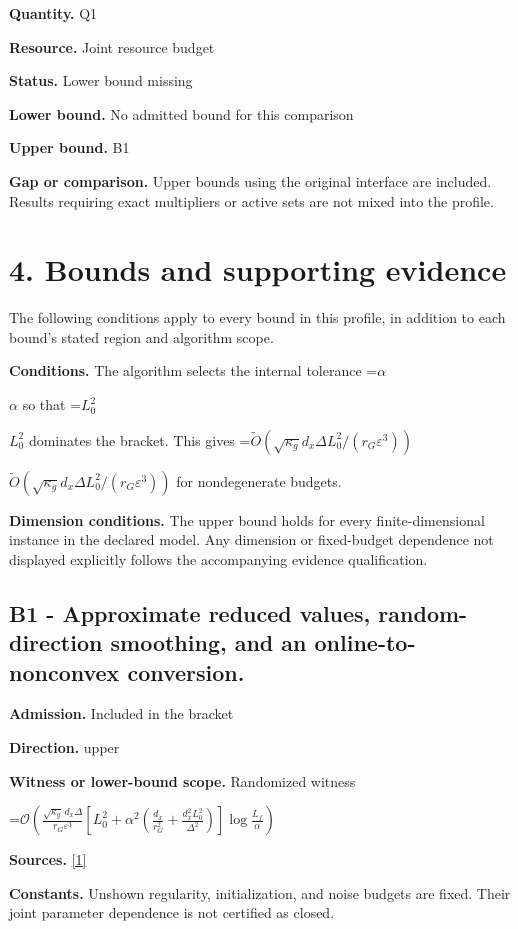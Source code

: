 \documentclass[10pt,a4paper]{article}
\newcommand{\AtlasMath}[1]{\par\begingroup\centering\setbox0=\hbox{$\displaystyle #1$}\ifdim\wd0>1.4\linewidth\typeout{ATLAS WIDE FORMULA: \the\wd0}\fi\ifdim\wd0>\linewidth\resizebox{\linewidth}{!}{\box0}\else\box0\fi\par\endgroup}
\newcommand{\AtlasInlineMath}[1]{\begingroup\setbox0=\hbox{$#1$}\ifdim\wd0>.4\linewidth\endgroup\AtlasMath{#1}\else\endgroup$#1$\fi}
\begin{document}
\textbf{Quantity.} Q1

\textbf{Resource.} Joint resource budget

\textbf{Status.} Lower bound missing

\textbf{Lower bound.} No admitted bound for this comparison

\textbf{Upper bound.} B1

\textbf{Gap or comparison.} Upper bounds using the original interface are included. Results requiring exact multipliers or active sets are not mixed into the profile.

\section{4. Bounds and supporting evidence}
The following conditions apply to every bound in this profile, in addition to each bound's stated region and algorithm scope.

\textbf{Conditions.} The algorithm selects the internal tolerance \AtlasInlineMath{\alpha} so that \AtlasInlineMath{L_0^2} dominates the bracket. This gives \AtlasInlineMath{\widetilde O(\sqrt{\kappa_g}d_x\Delta L_0^2/(r_G\varepsilon^3))} for nondegenerate budgets.

\textbf{Dimension conditions.} The upper bound holds for every finite-dimensional instance in the declared model. Any dimension or fixed-budget dependence not displayed explicitly follows the accompanying evidence qualification.

\subsection{B1 - Approximate reduced values, random-direction smoothing, and an online-to-nonconvex conversion.}
\textbf{Admission.} Included in the bracket

\textbf{Direction.} upper

\textbf{Witness or lower-bound scope.} Randomized witness

\AtlasMath{\mathcal{O}\!\left(\frac{\sqrt{\kappa_g}\,d_x\Delta}{r_G\varepsilon^3}\left[L_0^2+\alpha^2\left(\frac{d_x}{r_G^2}+\frac{d_x^2L_0^2}{\Delta^2}\right)\right]\log\frac{L_f}{\alpha}\right)}
\textbf{Sources.} \href{https://proceedings.neurips.cc/paper_files/paper/2024/file/ffd86e56e6403d63dd6face033060e5a-Paper-Conference.pdf}{[1]}

\textbf{Constants.} Unshown regularity, initialization, and noise budgets are fixed. Their joint parameter dependence is not certified as closed.
\end{document}
